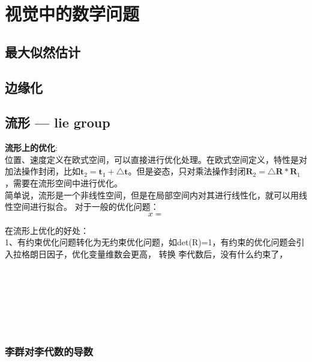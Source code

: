 \chapter{视觉中的数学问题}

\section{最大似然估计}

\section{边缘化}	

\section{流形 — lie group}
\noindent\textbf{流形上的优化}:\\
\indent 位置、速度定义在欧式空间，可以直接进行优化处理。在欧式空间定义，特性是对加法操作封闭，比如$\textbf{t}_2=\textbf{t}_1+\bigtriangleup \textbf{t}$。但是姿态，只对乘法操作封闭$\textbf{R}_2=\bigtriangleup \textbf{R}*\textbf{R}_1$，需要在流形空间中进行优化。\\
简单说，流形是一个非线性空间，但是在局部空间内对其进行线性化，就可以用线性空间进行拟合。
\indent 对于一般的优化问题：
\begin{equation}
x=
\end{equation}


在流形上优化的好处：\\
1、有约束优化问题转化为无约束优化问题，如det(R)=1，有约束的优化问题会引入拉格朗日因子，优化变量维数会更高， 转换 李代数后，没有什么约束了，
\\
\\
\\
\\
\\
\\
\\

\subsection{李群对李代数的导数 }


